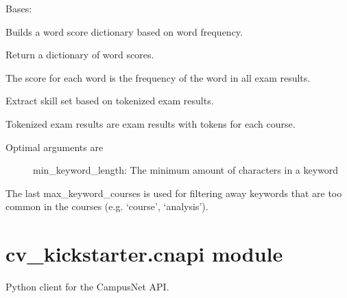 \documentclass[letterpaper,10pt,english]{sphinxmanual}
\begin{document}
\begin{fulllineitems}
\label{cv_kickstarter:cv_kickstarter.academic_skill_set.WordFrequencyScoreCalculator}
Bases: 

Builds a word score dictionary based on word frequency.

\begin{fulllineitems}
\label{cv_kickstarter:cv_kickstarter.academic_skill_set.WordFrequencyScoreCalculator.word_scorer}
Return a dictionary of word scores.

The score for each word is the frequency of the word in all
exam results.

\end{fulllineitems}


\end{fulllineitems}


\begin{fulllineitems}
\label{cv_kickstarter:cv_kickstarter.academic_skill_set.skill_set}
Extract skill set based on tokenized exam results.

Tokenized exam results are exam results with tokens for each course.
\begin{description}
\item[{Optimal arguments are}] \leavevmode
min\_keyword\_length: The minimum amount of characters in a keyword

\end{description}

The last max\_keyword\_courses is used for filtering away keywords that
are too common in the courses (e.g. `course', `analysis').

\end{fulllineitems}



\section{cv\_kickstarter.cnapi module}
\label{cv_kickstarter:cv-kickstarter-cnapi-module}\label{cv_kickstarter:module-cv_kickstarter.cnapi}
Python client for the CampusNet API.
\end{document}
